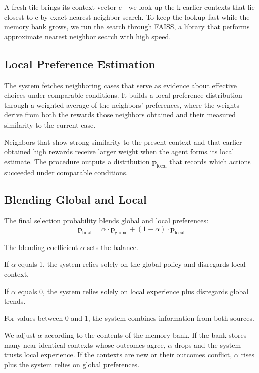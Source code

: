 \documentclass[11pt,a4paper]{article}
\begin{document}
A fresh tile brings its context vector c - we look up the k earlier contexts that lie closest to c by exact nearest neighbor search. To keep the lookup fast while the memory bank grows, we run the search through FAISS, a library that performs approximate nearest neighbor search with high speed.

\subsection{Local Preference Estimation}

The system fetches neighboring cases that serve as evidence about effective choices under comparable conditions. It builds a local preference distribution through a weighted average of the neighbors' preferences, where the weights derive from both the rewards those neighbors obtained and their measured similarity to the current case.

Neighbors that show strong similarity to the present context and that earlier obtained high rewards receive larger weight when the agent forms its local estimate. The procedure outputs a distribution $\mathbf{p}_{\text{local}}$ that records which actions succeeded under comparable conditions.

\subsection{Blending Global and Local}

The final selection probability blends global and local preferences:
\begin{equation}
\mathbf{p}_{\text{final}} = \alpha \cdot \mathbf{p}_{\text{global}} + (1 - \alpha) \cdot \mathbf{p}_{\text{local}}
\label{eq:blending}
\end{equation}

The blending coefficient $\alpha$ sets the balance.

If $\alpha$ equals 1, the system relies solely on the global policy and disregards local context.

If $\alpha$ equals 0, the system relies solely on local experience plus disregards global trends.

For values between 0 and 1, the system combines information from both sources.

We adjust $\alpha$ according to the contents of the memory bank. If the bank stores many near identical contexts whose outcomes agree, $\alpha$ drops and the system trusts local experience. If the contexts are new or their outcomes conflict, $\alpha$ rises plus the system relies on global preferences.
\end{document}
